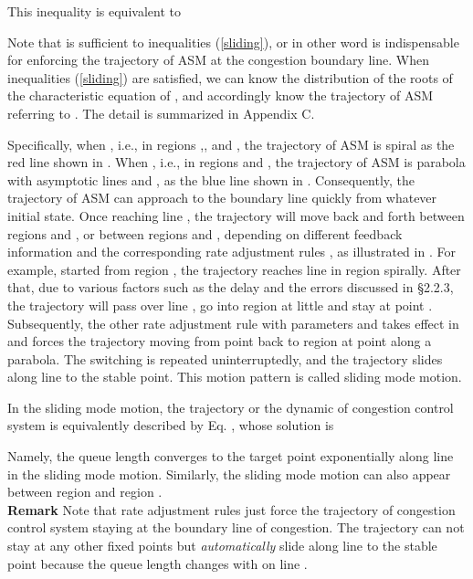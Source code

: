 \documentclass{sig-alternate-10pt}
\begin{document}
This inequality is equivalent to 

Note that  is sufficient to inequalities (\ref{sliding}), or in other word  is indispensable for enforcing the trajectory of ASM at the congestion boundary line. When inequalities (\ref{sliding}) are satisfied, we can know the distribution of the roots of the characteristic equation of , and accordingly know the trajectory of ASM referring to . The detail is summarized in Appendix C. 


Specifically, when  , i.e., in regions ,, and , the trajectory of ASM is spiral as the red line shown in . When , i.e., in regions  and , the trajectory of ASM is parabola with asymptotic lines  and , as the blue line shown in . Consequently, the trajectory of ASM can approach to the boundary line  quickly from whatever initial state. Once reaching line , the trajectory will move back and forth between regions  and , or between regions  and , depending on different feedback information and the corresponding rate adjustment rules , as illustrated in . For example, started from region , the trajectory reaches line  in region  spirally. After that, due to various factors such as the delay and the errors discussed in \S2.2.3, the trajectory will pass over line , go into region  at little and stay at point . Subsequently, the other rate adjustment rule with parameters  and  takes effect in  and forces the trajectory moving from point  back to region  at point  along a parabola. The switching is repeated uninterruptedly, and the trajectory slides along line  to the stable point. This motion pattern is called sliding mode motion.

In the sliding mode motion, the trajectory or the dynamic of congestion control system is equivalently described by Eq. , whose solution is 

Namely, the queue length  converges to the target point  exponentially along line  in the sliding mode motion. Similarly, the sliding mode motion can also appear between region  and region . \\
\textbf{Remark} Note that rate adjustment rules just force the trajectory of congestion control system staying at the boundary line  of congestion. The trajectory can not stay at any other fixed points but \textit{automatically} slide along line  to the stable point  because the queue length changes with  on line .
\end{document}
